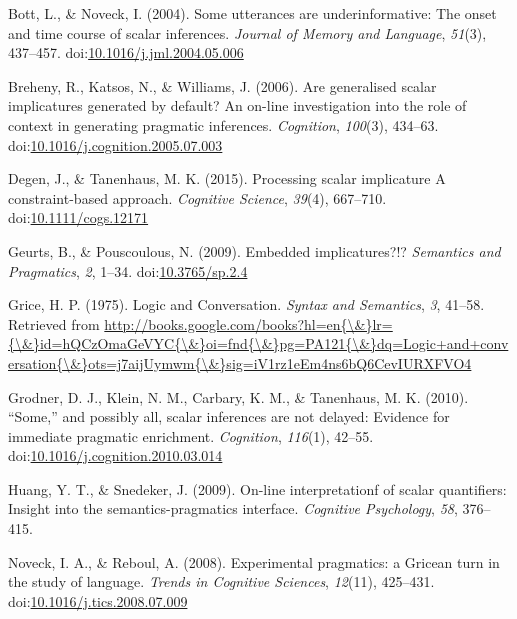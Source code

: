 \documentclass[floatsintext,man]{apa6}
\theoremstyle{definition}
\theoremstyle{definition}
\theoremstyle{definition}
\theoremstyle{remark}
\begin{document}
\setlength{\parindent}{-0.5in} \setlength{\leftskip}{0.5in}

\hypertarget{refs}{}
\hypertarget{ref-bott2004}{}
Bott, L., \& Noveck, I. (2004). Some utterances are underinformative:
The onset and time course of scalar inferences. \emph{Journal of Memory
and Language}, \emph{51}(3), 437--457.
doi:\href{https://doi.org/10.1016/j.jml.2004.05.006}{10.1016/j.jml.2004.05.006}

\hypertarget{ref-Breheny2006}{}
Breheny, R., Katsos, N., \& Williams, J. (2006). Are generalised scalar
implicatures generated by default? An on-line investigation into the
role of context in generating pragmatic inferences. \emph{Cognition},
\emph{100}(3), 434--63.
doi:\href{https://doi.org/10.1016/j.cognition.2005.07.003}{10.1016/j.cognition.2005.07.003}

\hypertarget{ref-DegenTanenhaus2015}{}
Degen, J., \& Tanenhaus, M. K. (2015). Processing scalar implicature A
constraint-based approach. \emph{Cognitive Science}, \emph{39}(4),
667--710.
doi:\href{https://doi.org/10.1111/cogs.12171}{10.1111/cogs.12171}

\hypertarget{ref-Geurts2009}{}
Geurts, B., \& Pouscoulous, N. (2009). Embedded implicatures?!?
\emph{Semantics and Pragmatics}, \emph{2}, 1--34.
doi:\href{https://doi.org/10.3765/sp.2.4}{10.3765/sp.2.4}

\hypertarget{ref-grice1975}{}
Grice, H. P. (1975). Logic and Conversation. \emph{Syntax and
Semantics}, \emph{3}, 41--58. Retrieved from
\href{http://books.google.com/books?hl=en\%7B/\&\%7Dlr=\%7B/\&\%7Did=hQCzOmaGeVYC\%7B/\&\%7Doi=fnd\%7B/\&\%7Dpg=PA121\%7B/\&\%7Ddq=Logic+and+conversation\%7B/\&\%7Dots=j7aijUymwm\%7B/\&\%7Dsig=iV1rz1eEm4ns6bQ6CevIURXFVO4}{http://books.google.com/books?hl=en\{\textbackslash{}\&\}lr=\{\textbackslash{}\&\}id=hQCzOmaGeVYC\{\textbackslash{}\&\}oi=fnd\{\textbackslash{}\&\}pg=PA121\{\textbackslash{}\&\}dq=Logic+and+conversation\{\textbackslash{}\&\}ots=j7aijUymwm\{\textbackslash{}\&\}sig=iV1rz1eEm4ns6bQ6CevIURXFVO4}

\hypertarget{ref-Grodner2010}{}
Grodner, D. J., Klein, N. M., Carbary, K. M., \& Tanenhaus, M. K.
(2010). ``Some,'' and possibly all, scalar inferences are not delayed:
Evidence for immediate pragmatic enrichment. \emph{Cognition},
\emph{116}(1), 42--55.
doi:\href{https://doi.org/10.1016/j.cognition.2010.03.014}{10.1016/j.cognition.2010.03.014}

\hypertarget{ref-huang2009}{}
Huang, Y. T., \& Snedeker, J. (2009). On-line interpretationf of scalar
quantifiers: Insight into the semantics-pragmatics interface.
\emph{Cognitive Psychology}, \emph{58}, 376--415.

\hypertarget{ref-noveck2008}{}
Noveck, I. A., \& Reboul, A. (2008). Experimental pragmatics: a Gricean
turn in the study of language. \emph{Trends in Cognitive Sciences},
\emph{12}(11), 425--431.
doi:\href{https://doi.org/10.1016/j.tics.2008.07.009}{10.1016/j.tics.2008.07.009}
\end{document}

